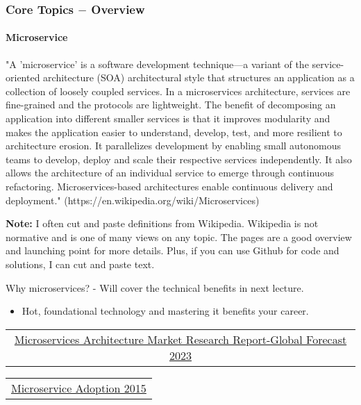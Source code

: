\documentclass[11pt]{article}
\providecommand{\tightlist}{%
      \setlength{\itemsep}{0pt}\setlength{\parskip}{0pt}}
\begin{document}
\subsubsection{\texorpdfstring{Core Topics \(-\)
Overview}{Core Topics - Overview}}\label{core-topics---overview}

\paragraph{Microservice}\label{microservice}

"A 'microservice' is a software development technique---a variant of the
service-oriented architecture (SOA) architectural style that structures
an application as a collection of loosely coupled services. In a
microservices architecture, services are fine-grained and the protocols
are lightweight. The benefit of decomposing an application into
different smaller services is that it improves modularity and makes the
application easier to understand, develop, test, and more resilient to
architecture erosion. It parallelizes development by enabling small
autonomous teams to develop, deploy and scale their respective services
independently. It also allows the architecture of an individual service
to emerge through continuous refactoring. Microservices-based
architectures enable continuous delivery and deployment."
(https://en.wikipedia.org/wiki/Microservices)

\textbf{Note:} {I often cut and paste definitions from Wikipedia.
Wikipedia is not normative and is one of many views on any topic. The
pages are a good overview and launching point for more details. Plus, if
you can use Github for code and solutions, I can cut and paste text.}

Why microservices? - Will cover the technical benefits in next lecture.

\begin{itemize}
\tightlist
\item
  Hot, foundational technology and mastering it benefits your career.
\end{itemize}

\begin{longtable}[]{@{}c@{}}
\toprule
\tabularnewline
\midrule
\endhead
\href{https://www.marketresearchfuture.com/reports/microservices-architecture-market-3149}{Microservices
Architecture Market Research Report-Global Forecast 2023}\tabularnewline
\bottomrule
\end{longtable}

\begin{longtable}[]{@{}c@{}}
\toprule
\tabularnewline
\midrule
\endhead
\href{https://www.nginx.com/resources/library/app-dev-survey/}{Microservice
Adoption 2015}\tabularnewline
\bottomrule
\end{longtable}
\end{document}

